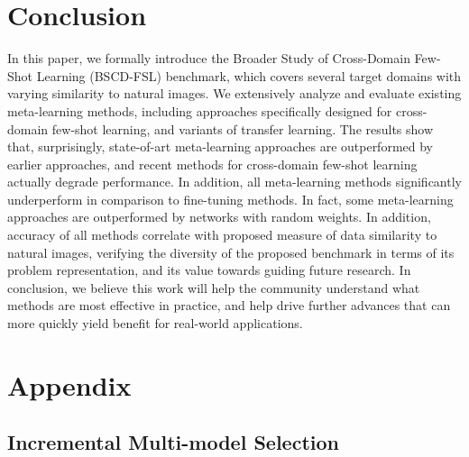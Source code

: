 \documentclass[runningheads]{llncs}
\begin{document}
\section{Conclusion}
In this paper, we formally introduce the Broader Study of Cross-Domain Few-Shot Learning (BSCD-FSL) benchmark, which covers several target domains with varying similarity to natural images. We extensively analyze and evaluate existing meta-learning methods, including approaches specifically designed for cross-domain few-shot learning, and variants of transfer learning. The results show that, surprisingly, state-of-art meta-learning approaches are outperformed by earlier approaches, and recent methods for cross-domain few-shot learning actually degrade performance. In addition, all meta-learning methods significantly underperform in comparison to fine-tuning methods. In fact, some meta-learning approaches are outperformed by networks with random weights. In addition, accuracy of all methods correlate with proposed measure of data similarity to natural images, verifying the diversity of the proposed benchmark in terms of its problem representation, and its value towards guiding future research. In conclusion, we believe this work will help the community understand what methods are most effective in practice, and help drive further advances that can more quickly yield benefit for real-world applications. 

\newpage



\newpage
\section{Appendix}


\subsection{Incremental Multi-model Selection}
\end{document}
